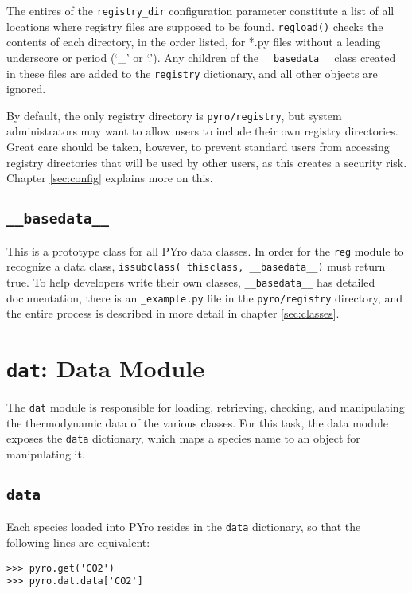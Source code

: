 The entires of the \verb|registry_dir| configuration parameter constitute a list of all locations where registry files are supposed to be found.  \verb|regload()| checks the contents of each directory, in the order listed, for *.py files without a leading underscore or period (`\_' or `.').  Any children of the \verb|__basedata__| class created in these files are added to the \verb|registry| dictionary, and all other objects are ignored.

By default, the only registry directory is \verb|pyro/registry|, but system administrators may want to allow users to include their own registry directories.  Great care should be taken, however, to prevent standard users from accessing registry directories that will be used by other users, as this creates a security risk.  Chapter \ref{sec:config} explains more on this.

\subsection{\texttt{\_\_basedata\_\_}}
This is a prototype class for all PYro data classes.  In order for the \verb|reg| module to recognize a data class, \verb|issubclass( thisclass, __basedata__)| must return true.  To help developers write their own classes, \verb|__basedata__| has detailed documentation, there is an \verb|_example.py| file in the \verb|pyro/registry| directory, and the entire process is described in more detail in chapter \ref{sec:classes}.



\section{\texttt{dat}: Data Module}\label{sec:dat}
The \verb|dat| module is responsible for loading, retrieving, checking, and manipulating the thermodynamic data of the various classes.  For this task, the data module exposes the \verb|data| dictionary, which maps a species name to an object for manipulating it.

\subsection{\texttt{data}}
Each species loaded into PYro resides in the \verb|data| dictionary, so that the following lines are equivalent:
\begin{verbatim}
>>> pyro.get('CO2')
>>> pyro.dat.data['CO2']
\end{verbatim}

